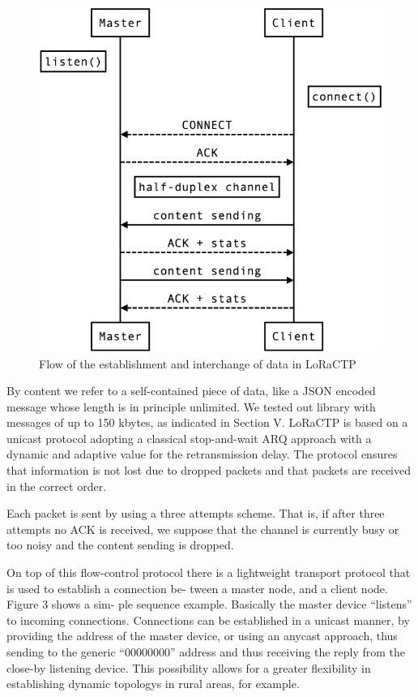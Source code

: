 				\begin{figure}[H]
					\centering
					\includegraphics[width=.5\textwidth]{resources/img/chap4/loractp_flow}
					\caption[Flow of the establishment and interchange of data in LoRaCTP]{Flow of the establishment and interchange of data in LoRaCTP \cite{loractp}}
				\end{figure}
		
		By content we refer to a self-contained piece of data, like a
		JSON encoded message whose length is in principle unlimited.
		We tested out library with messages of up to 150 kbytes,
		as indicated in Section V. LoRaCTP is based on a unicast
		protocol adopting a classical stop-and-wait ARQ approach
		with a dynamic and adaptive value for the retransmission
		delay. The protocol ensures that information is not lost due to
		dropped packets and that packets are received in the correct
		order.
		
		Each packet is sent by using a three attempts scheme. That
		is, if after three attempts no ACK is received, we suppose
		that the channel is currently busy or too noisy and the content
		sending is dropped.
		
		On top of this ﬂow-control protocol there is a lightweight
		transport protocol that is used to establish a connection be-
		tween a master node, and a client node. Figure 3 shows a sim-
		ple sequence example. Basically the master device “listens”
		to incoming connections. Connections can be established in a
		unicast manner, by providing the address of the master device,
		or using an anycast approach, thus sending to the generic
		“00000000” address and thus receiving the reply from the
		close-by listening device. This possibility allows for a greater
		ﬂexibility in establishing dynamic topologys in rural areas, for
		example.
		

